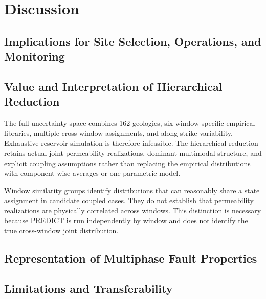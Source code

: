 
\section{Discussion}

\subsection{Implications for Site Selection, Operations, and Monitoring}


\subsection{Value and Interpretation of Hierarchical Reduction}

The full uncertainty space combines 162 geologies, six window-specific
empirical libraries, multiple cross-window assignments, and along-strike
variability. Exhaustive reservoir simulation is therefore infeasible. The
hierarchical reduction retains actual joint permeability realizations,
dominant multimodal structure, and explicit coupling assumptions rather than
replacing the empirical distributions with component-wise averages or one
parametric model.

Window similarity groups identify distributions that can reasonably share a
state assignment in candidate coupled cases. They do not establish that
permeability realizations are physically correlated across windows. This
distinction is necessary because PREDICT is run independently by window and
does not identify the true cross-window joint distribution.

\subsection{Representation of Multiphase Fault Properties}


\subsection{Limitations and Transferability}

